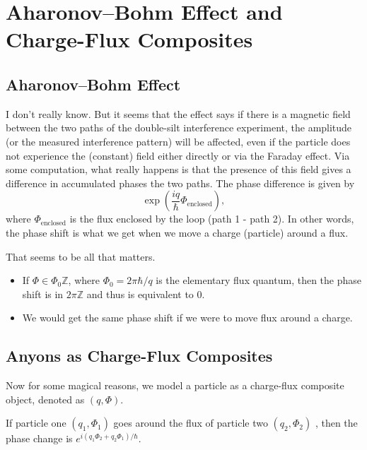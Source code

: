 \TODO







\section{Aharonov--Bohm Effect and Charge-Flux Composites}



\subsection{Aharonov--Bohm Effect}

I don't really know. But it seems that the effect says if there is a magnetic field between the two paths of the double-silt interference experiment, the amplitude (or the measured interference pattern) will be affected, even if the particle does not experience the (constant) field either directly or via the Faraday effect. Via some computation, what really happens is that the presence of this field gives a difference in accumulated phases the two paths. The phase difference is given by $$
\exp \left(  \frac{iq}{\hbar} \Phi_{\text{enclosed}}  \right)
,$$
where $\Phi_{\text{enclosed}}$ is the flux enclosed by the loop (path 1 - path 2). In other words, the phase shift is what we get when we move a charge (particle) around a flux.  


That seems to be all that matters.

\begin{itemize}
    \item If $\Phi \in \Phi_0 \mathbb{Z} $, where $\Phi_0 = 2 \pi \hbar / q$ is the elementary flux quantum, then the phase shift is in $2 \pi \mathbb{Z}$ and thus is equivalent to $0$.     
    \item We would get the same phase shift if we were to move flux around a charge. 
\end{itemize}


\subsection{Anyons as Charge-Flux Composites}


Now for some magical reasons, we model a particle as a charge-flux composite object, denoted as $(q, \Phi)$. 

\begin{proposition}
  If particle one $(q_1, \Phi_1)$  goes around the flux of particle two $(q_2, \Phi_2)$ , then the phase change is $e^{ i (q_1 \Phi_2 + q_2 \Phi_1) / \hbar}$. 
\end{proposition}

